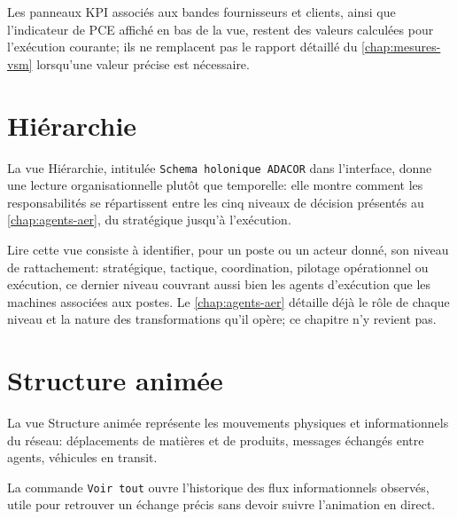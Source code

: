 Les panneaux KPI associés aux bandes fournisseurs et clients, ainsi que l'indicateur de PCE affiché en bas de la vue, restent des valeurs calculées pour l'exécution courante; ils ne remplacent pas le rapport détaillé du \cref{chap:mesures-vsm} lorsqu'une valeur précise est nécessaire.

\section{Hiérarchie}

La vue Hiérarchie, intitulée \texttt{Schema holonique ADACOR} dans l'interface, donne une lecture organisationnelle plutôt que temporelle: elle montre comment les responsabilités se répartissent entre les cinq niveaux de décision présentés au \cref{chap:agents-aer}, du stratégique jusqu'à l'exécution.


Lire cette vue consiste à identifier, pour un poste ou un acteur donné, son niveau de rattachement: stratégique, tactique, coordination, pilotage opérationnel ou exécution, ce dernier niveau couvrant aussi bien les agents d'exécution que les machines associées aux postes. Le \cref{chap:agents-aer} détaille déjà le rôle de chaque niveau et la nature des transformations qu'il opère; ce chapitre n'y revient pas.

\section{Structure animée}

La vue Structure animée représente les mouvements physiques et informationnels du réseau: déplacements de matières et de produits, messages échangés entre agents, véhicules en transit.


La commande \texttt{Voir tout} ouvre l'historique des flux informationnels observés, utile pour retrouver un échange précis sans devoir suivre l'animation en direct.



